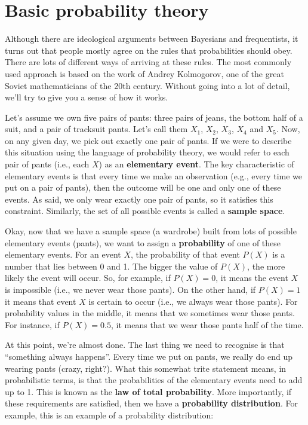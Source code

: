 \documentclass[
  11pt,
  a4paper,
  twoside,symmetric,openright]{book}
\theoremstyle{break}
\theoremstyle{break}
\begin{document}
\section{Basic probability theory}\label{basicprobability}

Although there are ideological arguments between Bayesians and frequentists, it turns out that people mostly agree on the rules that probabilities should obey. There are lots of different ways of arriving at these rules. The most commonly used approach is based on the work of Andrey Kolmogorov, one of the great Soviet mathematicians of the 20th century. Without going into a lot of detail, we'll try to give you a sense of how it works.

Let's assume we own five pairs of pants: three pairs of jeans, the bottom half of a suit, and a pair of tracksuit pants. Let's call them \(X_1\), \(X_2\), \(X_3\), \(X_4\) and \(X_5\). Now, on any given day, we pick out exactly one pair of pants. If we were to describe this situation using the language of probability theory, we would refer to each pair of pants (i.e., each \(X\)) as an \textbf{elementary event}. The key characteristic of elementary events is that every time we make an observation (e.g., every time we put on a pair of pants), then the outcome will be one and only one of these events. As said, we only wear exactly one pair of pants, so it satisfies this constraint. Similarly, the set of all possible events is called a \textbf{sample space}.

Okay, now that we have a sample space (a wardrobe) built from lots of possible elementary events (pants), we want to assign a \textbf{probability} of one of these elementary events. For an event \(X\), the probability of that event \(P(X)\) is a number that lies between 0 and 1. The bigger the value of \(P(X)\), the more likely the event will occur. So, for example, if \(P(X) = 0\), it means the event \(X\) is impossible (i.e., we never wear those pants). On the other hand, if \(P(X) = 1\) it means that event \(X\) is certain to occur (i.e., we always wear those pants). For probability values in the middle, it means that we sometimes wear those pants. For instance, if \(P(X) = 0.5\), it means that we wear those pants half of the time.

At this point, we're almost done. The last thing we need to recognise is that ``something always happens''. Every time we put on pants, we really do end up wearing pants (crazy, right?). What this somewhat trite statement means, in probabilistic terms, is that the probabilities of the elementary events need to add up to 1. This is known as the \textbf{law of total probability}. More importantly, if these requirements are satisfied, then we have a \textbf{probability distribution}. For example, this is an example of a probability distribution:
\end{document}
